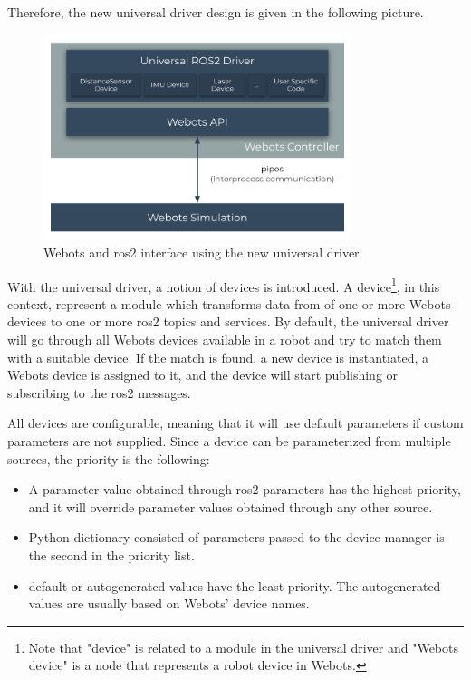 Therefore, the new universal driver design is given in the following picture.
\begin{figure}[H]
    \centering
    \includegraphics[width=0.8\textwidth]{generalization/figures/universal_driver_within_webots.pdf}
    \caption{Webots and \ac{ros2} interface using the new universal driver}
    \label{fig:generalization:universal_driver_within_webots}
\end{figure}

With the universal driver, a notion of devices is introduced.
A device\footnote{Note that "device" is related to a module in the universal driver and "Webots device" is a node that represents a robot device in Webots.}, in this context, represent a module which transforms data from of one or more Webots devices to one or more \ac{ros2} topics and services.
By default, the universal driver will go through all Webots devices available in a robot and try to match them with a suitable device.
If the match is found, a new device is instantiated, a Webots device is assigned to it, and the device will start publishing or subscribing to the \ac{ros2} messages.

All devices are configurable, meaning that it will use default parameters if custom parameters are not supplied.
Since a device can be parameterized from multiple sources, the priority is the following:
\begin{itemize}
    \item A parameter value obtained through \ac{ros2} parameters has the highest priority, and it will override parameter values obtained through any other source.
    \item Python dictionary consisted of parameters passed to the device manager is the second in the priority list.
    \item default or autogenerated values have the least priority. The autogenerated values are usually based on Webots' device names.
\end{itemize}


